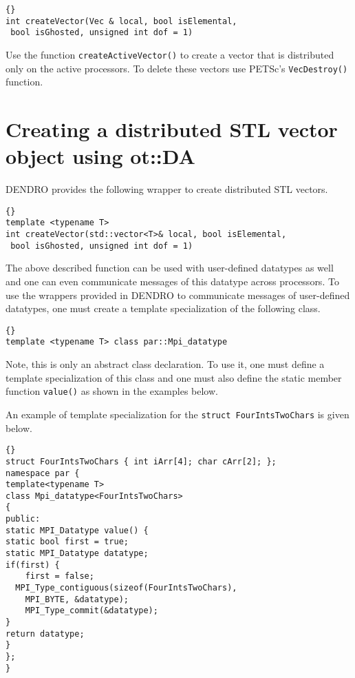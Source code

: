 \documentclass[10pt,reqno,a4paper]{report}
\numberwithin{equation}{section}
\begin{document}
\begin{lstlisting}[frame=trbl, fontadjust]{}
int createVector(Vec & local, bool isElemental,
 bool isGhosted, unsigned int dof = 1)
\end{lstlisting}

Use the function \lstinline[basicstyle=\bfseries]!createActiveVector()! to create a vector that is distributed only on the active processors. To delete these vectors use PETSc's \lstinline[basicstyle=\bfseries]!VecDestroy()! function.

\section{Creating a distributed STL vector object using ot::DA}
\label{sec:stlveccreate}
DENDRO provides the following wrapper to create distributed STL vectors.

\begin{lstlisting}[frame=trbl, fontadjust]{}
template <typename T>
int createVector(std::vector<T>& local, bool isElemental,
 bool isGhosted, unsigned int dof = 1)
\end{lstlisting}

The above described function can be used with user-defined datatypes as well and one can even communicate messages of this datatype across processors. To use the wrappers provided in DENDRO to communicate messages of user-defined datatypes, one must create a template specialization of the following class.

\begin{lstlisting}[frame=trbl, fontadjust]{}
template <typename T> class par::Mpi_datatype
\end{lstlisting}

Note, this is only an abstract class declaration. To use it, one must define a template specialization of this class
 and one must also define the static member function \lstinline[basicstyle=\bfseries]!value()! as
 shown in the examples below.
 
An example of template specialization for the \lstinline[basicstyle=\bfseries]!struct FourIntsTwoChars! is given below.

\begin{lstlisting}[frame=trbl, fontadjust]{}
struct FourIntsTwoChars { int iArr[4]; char cArr[2]; };
namespace par {
template<typename T>
class Mpi_datatype<FourIntsTwoChars>
{
public:
static MPI_Datatype value() {
static bool first = true;
static MPI_Datatype datatype;
if(first) {
	first = false;
  MPI_Type_contiguous(sizeof(FourIntsTwoChars),
	MPI_BYTE, &datatype);
	MPI_Type_commit(&datatype);
}
return datatype;
}
};
}
\end{lstlisting}
\end{document}
